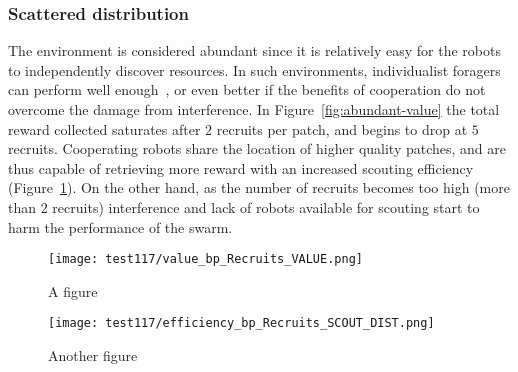 \documentclass[runningheads]{llncs}
\begin{document}
\subsubsection{Scattered distribution}

The environment is considered abundant since it is relatively easy for the robots to independently discover resources. In such environments, individualist foragers can perform well enough~\cite{pitonakova_icr_2018,wilson_sociobiology_2000}, or even better if the benefits of cooperation do not overcome the damage from interference. In Figure~\ref{fig:abundant-value} the total reward collected saturates after $2$ recruits per patch, and begins to drop at $5$ recruits. Cooperating robots share the location of higher quality patches, and are thus capable of retrieving more reward with an increased scouting efficiency (Figure~\ref{fig:abundant-eff-exp}). On the other hand, as the number of recruits becomes too high (more than $2$ recruits) interference and lack of robots available for scouting start to harm the performance of the swarm.

\begin{figure}
\centering
\begin{minipage}{.495\textwidth}
  \centering
  \texttt{[image: test117/value\_bp\_Recruits\_VALUE.png]}
  \caption{A figure}
  \label{fig:abundant-value}
\end{minipage}
\centering
\begin{minipage}{.495\textwidth}
  \centering
  \texttt{[image: test117/efficiency\_bp\_Recruits\_SCOUT\_DIST.png]}
  \caption{Another figure}
  \label{fig:abundant-eff-exp}
\end{minipage}
\end{figure}

\end{document}
